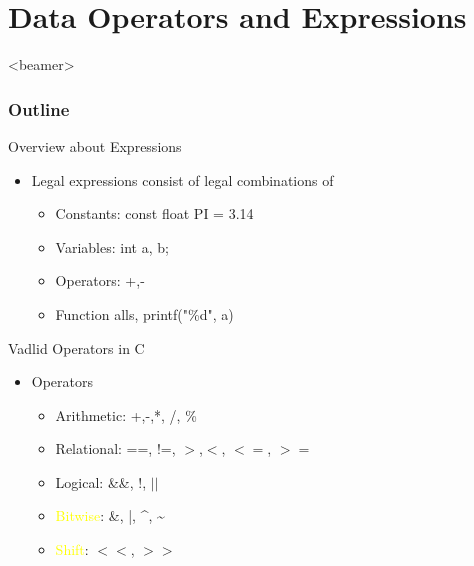 \section{Data Operators and Expressions}
\label{sec:oper}
\begin{frame}<beamer>
    \frametitle{Outline}
    \tableofcontents[currentsection]
\end{frame}

\begin{frame}[fragile]{Overview about Expressions}
\begin{itemize}
	\item {Legal expressions consist of legal combinations of}
	\begin{itemize}
		\item {Constants: const float PI = 3.14}
		\item {Variables: int a, b;}
		\item {Operators: +,-}
		\item {Function alls, printf("\%d", a)}
	\end{itemize}
\end{itemize}

\end{frame}

\begin{frame}[fragile]{Vadlid Operators in C}
\begin{itemize}
	\item {Operators}
	\begin{itemize}
		\item {Arithmetic: +,-,*, /, \%}
		\item {Relational: ==, !=, $>$,$<$, $<=$, $>=$}
		\item {Logical: \&\&, !, $||$}
		\item {\textcolor{yellow}{Bitwise}: \&, |, \^{ }, \~{ }}
		\item {\textcolor{yellow}{Shift}: $<<$, $>>$}
	\end{itemize}
\end{itemize}
\end{frame}

